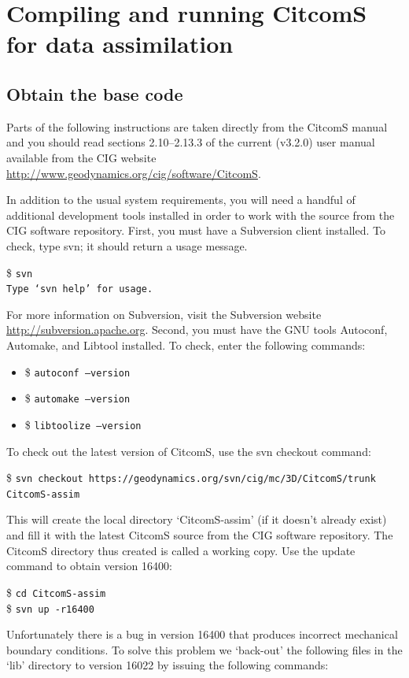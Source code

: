 \documentclass[letterpaper,12pt]{article}
\newcommand{\tm}[1]{\$ \texttt{#1}}
\newcommand{\tmo}[1]{\texttt{#1}}
\begin{document}
\section{Compiling and running CitcomS for data assimilation}
\subsection{Obtain the base code}
Parts of the following instructions are taken directly from the CitcomS manual and you should read sections 2.10--2.13.3 of the current (v3.2.0) user manual available from the CIG website \url{http://www.geodynamics.org/cig/software/CitcomS}.

In addition to the usual system requirements, you will need a handful of additional development tools installed in order to work with the source from the CIG software repository.  First, you must have a Subversion client installed.  To check, type svn; it should return a usage message.

\tm{svn} \\
\tmo{Type `svn help' for usage.}

For more information on Subversion, visit the Subversion website \url{http://subversion.apache.org}.
Second, you must have the GNU tools Autoconf, Automake, and Libtool installed.  To check, enter the following commands:
\begin{itemize}
\item \tm{autoconf --version}
\item \tm{automake --version}
\item \tm{libtoolize --version}
\end{itemize}
To check out the latest version of CitcomS, use the svn checkout command:

\tm{svn checkout https://geodynamics.org/svn/cig/mc/3D/CitcomS/trunk CitcomS-assim}

This will create the local directory `CitcomS-assim' (if it doesn't already exist) and fill it with the latest CitcomS source from the CIG software repository.  The CitcomS directory thus created is called a working copy.  Use the update command to obtain version 16400:

\tm{cd CitcomS-assim}\\
\tm{svn up -r16400}

Unfortunately there is a bug in version 16400 that produces incorrect mechanical boundary conditions.  To solve this problem we `back-out' the following files in the `lib' directory to version 16022 by issuing the following commands:
\end{document}
